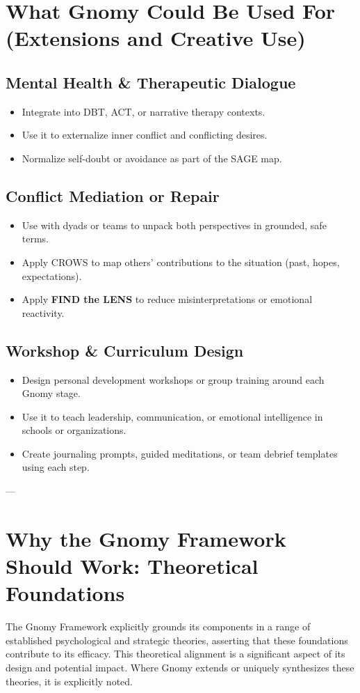 \documentclass{article}
\begin{document}
\section{What Gnomy Could Be Used For (Extensions and Creative Use)}

\subsection{Mental Health \& Therapeutic Dialogue}
\begin{itemize}[noitemsep,topsep=0pt]
    \item Integrate into DBT, ACT, or narrative therapy contexts.
    \item Use it to externalize inner conflict and conflicting desires.
    \item Normalize self-doubt or avoidance as part of the SAGE map.
\end{itemize}

\subsection{Conflict Mediation or Repair}
\begin{itemize}[noitemsep,topsep=0pt]
    \item Use with dyads or teams to unpack both perspectives in grounded, safe terms.
    \item Apply CROWS to map others' contributions to the situation (past, hopes, expectations).
    \item Apply \textbf{FIND the LENS} to reduce misinterpretations or emotional reactivity.
\end{itemize}

\subsection{Workshop \& Curriculum Design}
\begin{itemize}[noitemsep,topsep=0pt]
    \item Design personal development workshops or group training around each Gnomy stage.
    \item Use it to teach leadership, communication, or emotional intelligence in schools or organizations.
    \item Create journaling prompts, guided meditations, or team debrief templates using each step.
\end{itemize}

---

\section{Why the Gnomy Framework Should Work: Theoretical Foundations}
The Gnomy Framework explicitly grounds its components in a range of established psychological and strategic theories, asserting that these foundations contribute to its efficacy. This theoretical alignment is a significant aspect of its design and potential impact. Where Gnomy extends or uniquely synthesizes these theories, it is explicitly noted.
\end{document}
